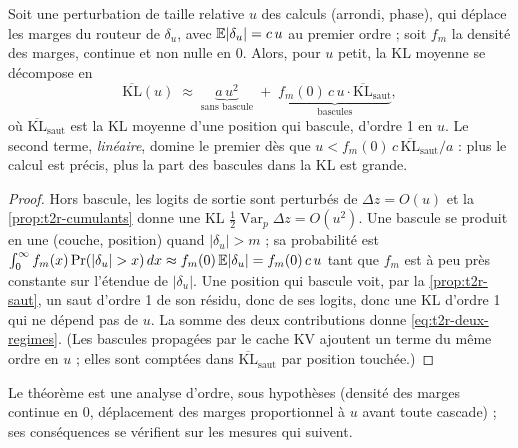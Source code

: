 \begin{theoreme}\label{thm:t2r-amplification}
Soit une perturbation de taille relative $u$ des calculs (arrondi, phase), qui déplace les marges du routeur de $\delta_u$, avec $\mathbb{E}|\delta_u| = c\,u$ au premier ordre ; soit $f_m$ la densité des marges, continue et non nulle en 0. Alors, pour $u$ petit, la KL moyenne se décompose en
\begin{equation}\label{eq:t2r-deux-regimes}
\overline{\mathrm{KL}}(u) \;\approx\; \underbrace{a\,u^2}_{\text{sans bascule}} \;+\; \underbrace{f_m(0)\, c\, u \cdot \overline{\mathrm{KL}}_{\text{saut}}}_{\text{bascules}},
\end{equation}
où $\overline{\mathrm{KL}}_{\text{saut}}$ est la KL moyenne d'une position qui bascule, d'ordre 1 en $u$. Le second terme, \emph{linéaire}, domine le premier dès que $u < f_m(0)\,c\,\overline{\mathrm{KL}}_{\text{saut}}/a$ : plus le calcul est précis, plus la part des bascules dans la KL est grande.
\end{theoreme}

\begin{proof}
Hors bascule, les logits de sortie sont perturbés de $\Delta z = O(u)$ et la \cref{prop:t2r-cumulants} donne une KL $\tfrac12\operatorname{Var}_p\Delta z = O(u^2)$. Une bascule se produit en une (couche, position) quand $|\delta_u| > m$ ; sa probabilité est $\int_0^\infty f_m(x)\Pr(|\delta_u| > x)\,dx \approx f_m(0)\,\mathbb{E}|\delta_u| = f_m(0)\,c\,u$ tant que $f_m$ est à peu près constante sur l'étendue de $|\delta_u|$. Une position qui bascule voit, par la \cref{prop:t2r-saut}, un saut d'ordre 1 de son résidu, donc de ses logits, donc une KL d'ordre 1 qui ne dépend pas de $u$. La somme des deux contributions donne \eqref{eq:t2r-deux-regimes}. (Les bascules propagées par le cache KV ajoutent un terme du même ordre en $u$ ; elles sont comptées dans $\overline{\mathrm{KL}}_{\text{saut}}$ par position touchée.)
\end{proof}

Le théorème est une analyse d'ordre, sous hypothèses (densité des marges continue en 0, déplacement des marges proportionnel à $u$ avant toute cascade) ; ses conséquences se vérifient sur les mesures qui suivent.

